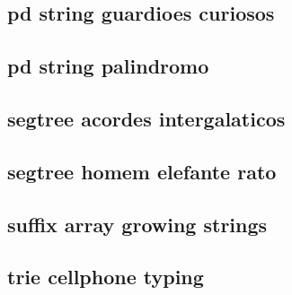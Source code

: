 \subsection{pd string guardioes curiosos}
\raggedbottom
\hrulefill
\subsection{pd string palindromo}
\raggedbottom
\hrulefill
\subsection{segtree acordes intergalaticos}
\raggedbottom
\hrulefill
\subsection{segtree homem elefante rato}
\raggedbottom
\hrulefill
\subsection{suffix array growing strings}
\raggedbottom
\hrulefill
\subsection{trie cellphone typing}
\raggedbottom
\hrulefill
\clearpage
